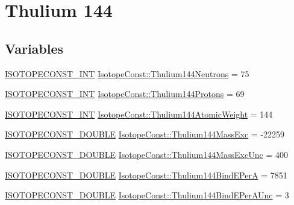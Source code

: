 \hypertarget{group___isotope_const-_thulium-_tm144}{}\section{Thulium 144}
\label{group___isotope_const-_thulium-_tm144}
\subsection*{Variables}
\begin{DoxyCompactItemize}
\item 
\mbox{\hyperlink{group___isotope_const-_macros_ga5f18360b3e99483a35c32d789e62621c}{I\+S\+O\+T\+O\+P\+E\+C\+O\+N\+S\+T\+\_\+\+I\+NT}} \mbox{\hyperlink{group___isotope_const-_thulium-_tm144_gaa4848372bcfa1595e16911304bbe3dd4}{Isotope\+Const\+::\+Thulium144\+Neutrons}} = 75
\item 
\mbox{\hyperlink{group___isotope_const-_macros_ga5f18360b3e99483a35c32d789e62621c}{I\+S\+O\+T\+O\+P\+E\+C\+O\+N\+S\+T\+\_\+\+I\+NT}} \mbox{\hyperlink{group___isotope_const-_thulium-_tm144_gaf5cfd47f93ce27e3a4d6cb7873d6cca9}{Isotope\+Const\+::\+Thulium144\+Protons}} = 69
\item 
\mbox{\hyperlink{group___isotope_const-_macros_ga5f18360b3e99483a35c32d789e62621c}{I\+S\+O\+T\+O\+P\+E\+C\+O\+N\+S\+T\+\_\+\+I\+NT}} \mbox{\hyperlink{group___isotope_const-_thulium-_tm144_ga9007e5e626f602985142969fbabb28a3}{Isotope\+Const\+::\+Thulium144\+Atomic\+Weight}} = 144
\item 
\mbox{\hyperlink{group___isotope_const-_macros_ga8f45a7272ce02c0b4c65c44636ed719a}{I\+S\+O\+T\+O\+P\+E\+C\+O\+N\+S\+T\+\_\+\+D\+O\+U\+B\+LE}} \mbox{\hyperlink{group___isotope_const-_thulium-_tm144_ga8c7418e4785d37c449bcaed612ad6c4e}{Isotope\+Const\+::\+Thulium144\+Mass\+Exc}} = -\/22259
\item 
\mbox{\hyperlink{group___isotope_const-_macros_ga8f45a7272ce02c0b4c65c44636ed719a}{I\+S\+O\+T\+O\+P\+E\+C\+O\+N\+S\+T\+\_\+\+D\+O\+U\+B\+LE}} \mbox{\hyperlink{group___isotope_const-_thulium-_tm144_ga8153ed9a02a36bb1addcdc82c0505baf}{Isotope\+Const\+::\+Thulium144\+Mass\+Exc\+Unc}} = 400
\item 
\mbox{\hyperlink{group___isotope_const-_macros_ga8f45a7272ce02c0b4c65c44636ed719a}{I\+S\+O\+T\+O\+P\+E\+C\+O\+N\+S\+T\+\_\+\+D\+O\+U\+B\+LE}} \mbox{\hyperlink{group___isotope_const-_thulium-_tm144_gaa45a84099daa329888de0315fecfb880}{Isotope\+Const\+::\+Thulium144\+Bind\+E\+PerA}} = 7851
\item 
\mbox{\hyperlink{group___isotope_const-_macros_ga8f45a7272ce02c0b4c65c44636ed719a}{I\+S\+O\+T\+O\+P\+E\+C\+O\+N\+S\+T\+\_\+\+D\+O\+U\+B\+LE}} \mbox{\hyperlink{group___isotope_const-_thulium-_tm144_ga8f606316af39839c103dd53ed9ad4283}{Isotope\+Const\+::\+Thulium144\+Bind\+E\+Per\+A\+Unc}} = 3

\end{DoxyCompactItemize}
